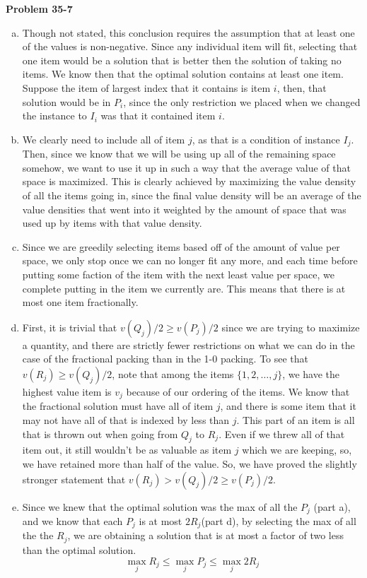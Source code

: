 \documentclass{article}
\begin{document}
\noindent\textbf{Problem 35-7}\\
\begin{enumerate}[a.]
\item Though not stated, this conclusion requires the assumption that at least one of the values is non-negative. Since any individual item will fit, selecting that one item would be a solution that is better then the solution of taking no items. We know then that the optimal solution contains at least one item. Suppose the item of largest index that it contains is item $i$, then, that solution would be in $P_i$, since the only restriction we placed when we changed the instance to $I_i$ was that it contained item $i$.
\item
We clearly need to include all of item $j$, as that is a condition of instance $I_j$. Then, since we know that we will be using up all of the remaining space somehow, we want to use it up in such a way that the average value of that space is maximized. This is clearly achieved by maximizing the value density of all the items going in, since the final value density will be an average of the value densities that went into it weighted by the amount of space that was used up by items with that value density. 
\item
Since we are greedily selecting items based off of the amount of value per space, we only stop once we can no longer fit any more, and each time before putting some faction of the item with the next least value per space, we complete putting in the item we currently are. This means that there is at most one item fractionally.
\item
First, it is trivial that $v(Q_j)/2 \ge v(P_j)/2$ since we are trying to maximize a quantity, and there are strictly fewer restrictions on what we can do in the case of the fractional packing than in the 1-0 packing. To see that $v(R_j) \ge v(Q_j)/2$, note that among the items $\{1,2,\ldots, j\}$, we have the highest value item is $v_j$ because of our ordering of the items. We know that the fractional solution must have all of item $j$, and there is some item that it may not have all of that is indexed by less than $j$. This part of an item is all that is thrown out when going from $Q_j$ to $R_j$. Even if we threw all of that item out, it still wouldn't be as valuable as item $j$ which we are keeping, so, we have retained more than half of the value. So, we have proved the slightly stronger statement that $v(R_j) > v(Q_j)/2 \ge v(P_j)/2$.
\item
Since we knew that the optimal solution was the max of all the $P_j$ (part a), and we know that each $P_j$ is at most $2R_j$(part d), by selecting the max of all the the $R_j$, we are obtaining a solution that is at most a factor of two less than the optimal solution.
\[
\max_j R_j \le \max_j P_j \le \max_j 2R_j
\]
\end{enumerate}
\end{document}
